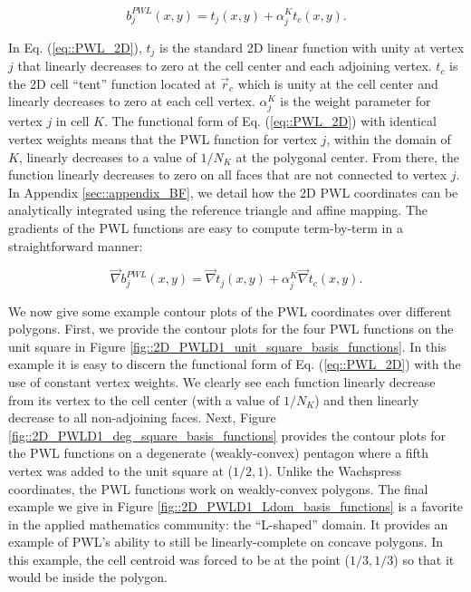 \begin{equation}
\label{eq::PWL_2D}
	b_j^{PWL} (x,y) = t_j (x,y) + \alpha_j^K t_c (x,y) .
\end{equation}

\noindent In Eq. (\ref{eq::PWL_2D}), $t_j$ is the standard 2D linear function with unity at vertex $j$ that linearly decreases to zero at the cell center and each adjoining vertex. $t_c$ is the 2D cell ``tent'' function located at $\vec{r}_{c}$ which is unity at the cell center and linearly decreases to zero at each cell vertex. $\alpha_{j}^{K}$ is the weight parameter for vertex $j$ in cell $K$. The functional form of Eq. (\ref{eq::PWL_2D}) with identical vertex weights means that the PWL function for vertex $j$, within the domain of $K$, linearly decreases to a value of $1/N_K$ at the polygonal center. From there, the function linearly decreases to zero on all faces that are not connected to vertex $j$. In Appendix \ref{sec::appendix_BF}, we detail how the 2D PWL coordinates can be analytically integrated using the reference triangle and affine mapping. The gradients of the PWL functions are easy to compute term-by-term in a straightforward manner:

\begin{equation}
\label{eq::PWL_2D_gradients}
	\vec{\nabla} b_j^{PWL} (x,y) = \vec{\nabla} t_j (x,y) + \alpha_j^K \vec{\nabla} t_c (x,y) .
\end{equation}

We now give some example contour plots of the PWL coordinates over different polygons. First, we provide the contour plots for the four PWL functions on the unit square in Figure \ref{fig::2D_PWLD1_unit_square_basis_functions}. In this example it is easy to discern the functional form of Eq. (\ref{eq::PWL_2D}) with the use of constant vertex weights. We clearly see each function linearly decrease from its vertex to the cell center (with a value of $1/N_K$) and then linearly decrease to all non-adjoining faces. Next, Figure \ref{fig::2D_PWLD1_deg_square_basis_functions} provides the contour plots for the PWL functions on a degenerate (weakly-convex) pentagon where a fifth vertex was added to the unit square at ($1/2,1$). Unlike the Wachspress coordinates, the PWL functions work on weakly-convex polygons. The final example we give in Figure \ref{fig::2D_PWLD1_Ldom_basis_functions} is a favorite in the applied mathematics community: the ``L-shaped'' domain. It provides an example of PWL's ability to still be linearly-complete on concave polygons. In this example, the cell centroid was forced to be at the point ($1/3,1/3$) so that it would be inside the polygon.


